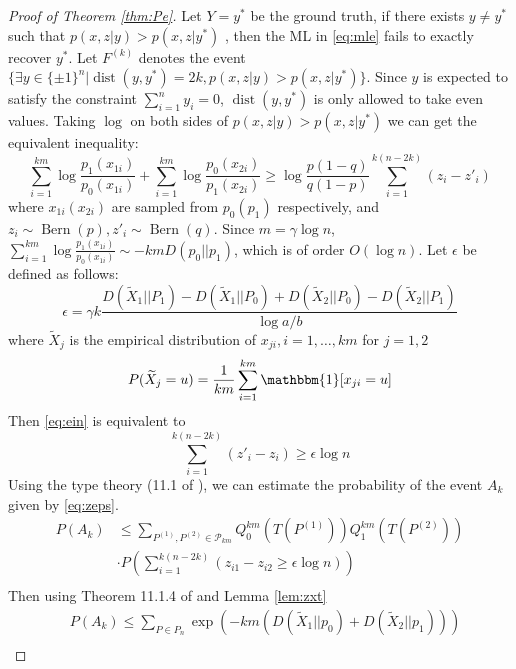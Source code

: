\documentclass[conference]{IEEEtran}
\DeclareMathOperator{\dist}{dist}
\DeclareMathOperator{\Bern}{Bern}
\begin{document}
\begin{proof}[Proof of Theorem \ref{thm:Pe}]
Let $Y=y^*$ be the ground truth, if there exists $y\neq y^*$ such that $p(x,z|y) > p(x,z|y^*)$	,
then the ML in \eqref{eq:mle} fails to exactly recover $y^*$. Let $F^{(k)}$ denotes
the event $\{\exists y \in \{\pm 1\}^n | \dist(y, y^*)=2k, p(x,z|y) > p(x,z|y^*) \}$. Since
$y$ is expected to satisfy the constraint $\sum_{i=1}^n y_i=0$, $\dist(y, y^*)$ is only allowed to take even
values. Taking $\log$ on both sides of $p(x,z|y) > p(x,z|y^*)$ we can get the equivalent inequality:
\begin{equation}\label{eq:ein}
\sum_{i=1}^{km} \log \frac{p_1(x_{1i})}{p_0(x_{1i})}
+\sum_{i=1}^{km} \log \frac{p_0(x_{2i})}{p_1(x_{2i})}
\geq \log \frac{p(1-q)}{q(1-p)} \sum_{i=1}^{k(n-2k)}(z_{i} - z'_{i})
\end{equation}
where $x_{1i}(x_{2i})$ are sampled from $p_0(p_1)$ respectively,
and $z_{i} \sim \Bern(p), z'_{i} \sim \Bern(q)$.
Since $m=\gamma \log n$, $\sum_{i=1}^{km} \log \frac{p_1(x_{1i})}{p_0(x_{1i})} \sim
-km D(p_0 || p_1)$, which is of order $O(\log n)$.
Let $\epsilon$ be defined as follows:
\begin{equation}
\epsilon = \gamma k\frac{D(\widetilde{X}_1 || P_1) - D(\widetilde{X}_1 || P_0) + D(\widetilde{X}_2 || P_0) - D(\widetilde{X}_2 || P_1)}{\log a /b}
\end{equation}
where $\widetilde{X}_j$ is the empirical distribution of $x_{ji},i=1,\dots,km$
for $j=1,2$
\begin{equation*}
P(\widetilde{X}_j = u) = \frac{1}{km} \sum_{i=1}^{km} \mathbbm{1}[x_{ji} = u]
\end{equation*}
Then \eqref{eq:ein} is equivalent to
\begin{equation}\label{eq:zeps}
\sum_{i=1}^{k(n-2k)}(z'_{i} - z_{i}) \geq \epsilon \log n
\end{equation}
Using the type theory (11.1 of \cite{cover1999elements}), we can estimate the probability of the event $A_k$ given by \eqref{eq:zeps}.
\begin{align*}
P(A_k) &\leq \sum_{P^{(1)},P^{(2)}\in \mathcal{P}_{km}} Q_0^{km}(T(P^{(1)}))Q_1^{km}(T(P^{(2)}))\\
& \cdot P(\sum_{i=1}^{k(n-2k)} (z_{i1} - z_{i2} \geq \epsilon \log n )) \\
\end{align*}
Then using Theorem 11.1.4 of \cite{cover1999elements} and Lemma \ref{lem:zxt} 
\begin{align*}
&P(A_k)  \leq \sum_{P \in P_n} \exp(-km (D(\widetilde{X}_1 || p_0) + D(\widetilde{X}_2 || p_1))) \\

\end{align*}
\end{proof}
\end{document}
